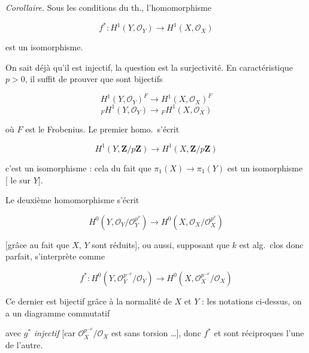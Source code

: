 \documentclass[11pt,a4paper]{article}
\begin{document}

\emph{Corollaire.} Sous les conditions du th., l'homomorphisme

\[ f^{*} : H^1(Y, \mathcal{O}_Y) \longrightarrow H^1(X, \mathcal{O}_X) \]

est un isomorphisme.

On sait déjà qu'il est injectif, la question est la surjectivité.
 En caractéristique $p > 0$, il suffit de prouver que sont
bijectifs

\[ H^1(Y, \mathcal{O}_Y)^F \longrightarrow H^1(X, \mathcal{O}_X)^F \]
\[ {}_F H^1(Y, \mathcal{O}_Y) \longrightarrow {}_F H^1(X, \mathcal{O}_X) \]

où $F$ est le Frobenius. Le premier homo.\ s'écrit

\[ H^1(Y, \mathbf{Z}/p\mathbf{Z}) \longrightarrow
   H^1(X, \mathbf{Z}/p\mathbf{Z}) \]

c'est un isomorphisme : cela \ill{} du fait que $\pi_1(X) \to \pi_1(Y)$ est
un isomorphisme [\ill{} le  sur $Y$].


Le deuxième homomorphisme s'écrit

\[ H^0(Y, \mathcal{O}_Y / \mathcal{O}_Y^{p^{\nu}}) \longrightarrow
   H^0(X, \mathcal{O}_X / \mathcal{O}_X^{p^{\nu}}) \]

[grâce au fait que $X$, $Y$ sont réduits], ou aussi, supposant que $k$ est
alg.\ clos donc parfait, s'interprète comme

\[ f^{*} : H^0(Y, \mathcal{O}_Y^{p^{-\nu}} / \mathcal{O}_Y) \longrightarrow
   H^0(X, \mathcal{O}_X^{p^{-\nu}} / \mathcal{O}_X) \]


Ce dernier est bijectif grâce à la normalité de $X$ et $Y$ : \ill{} \ill{}
les notations ci-dessus, on a un diagramme commutatif


avec $g^{*}$ \emph{injectif} [car $\mathcal{O}_X^{p^{-\nu}} / \mathcal{O}_X$
est sans torsion \ldots], donc $f^{*}$ et  sont
\ill{} réciproques l'une de l'autre.

\end{document}
